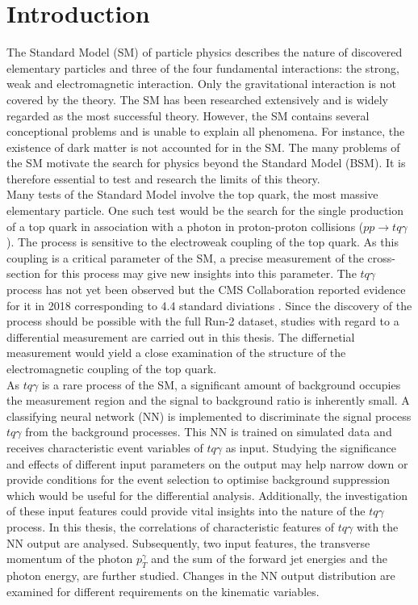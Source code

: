 \chapter{Introduction}

The Standard Model (SM) of particle physics  describes the nature of discovered elementary particles and three of the four fundamental interactions: the strong, weak and electromagnetic interaction. Only the gravitational interaction is not covered by the theory. The SM has been researched extensively and is widely regarded as the most successful theory. 
However, the SM contains several conceptional problems and is unable to explain all phenomena. For instance, the existence of dark matter is not accounted for in the SM. The many problems of the SM motivate the search for physics beyond the Standard Model (BSM). 
It is therefore essential to test and research the limits of this theory. \\
Many tests of the Standard Model involve the top quark, the most massive elementary particle. One such test would be the search for the single production of a top quark in association with a photon in proton-proton collisions ($pp \rightarrow tq\gamma$). 
The process is sensitive to the electroweak coupling of the top quark. As this coupling is a critical parameter of the SM, a precise measurement of the cross-section for this process may give new insights into this parameter. 
The $tq\gamma$ process has not yet been observed but the CMS Collaboration reported evidence for it in 2018 corresponding to 4.4 standard diviations \cite{CMS2}. Since the discovery of the process should be possible with the full Run-2 dataset, studies with regard to a differential measurement are carried out in this thesis. 
The differnetial measurement would yield a close examination of the structure of the electromagnetic coupling of the top quark. \\
As $tq\gamma$ is a rare process of the SM, a significant amount of background occupies the measurement region and the signal to background ratio is inherently small. A classifying neural network (NN) is implemented to discriminate the signal process $tq\gamma$ from the background processes. 
This NN is trained on simulated data and receives characteristic event variables of $tq\gamma$ as input. 
Studying the significance and effects of different input parameters on the output may help narrow down or provide conditions for the event selection to optimise background suppression which would be useful for the differential analysis. Additionally, the investigation of these input features could provide vital insights into the nature of the $tq\gamma$ process. 
In this thesis, the correlations of characteristic features of $tq\gamma$ with the NN output are analysed. 
Subsequently, two input features, the transverse momentum of the photon $p_T^\gamma$ and the sum of the forward jet energies and the photon energy, are further studied. 
Changes in the NN output distribution are examined for different requirements on the kinematic variables.

